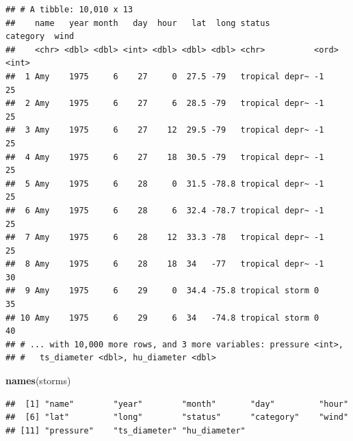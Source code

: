 \documentclass[]{article}
\newenvironment{Shaded}{\begin{snugshade}}{\end{snugshade}}
\newcommand{\CommentTok}[1]{\textcolor[rgb]{0.56,0.35,0.01}{\textit{#1}}}
\newcommand{\DataTypeTok}[1]{\textcolor[rgb]{0.13,0.29,0.53}{#1}}
\newcommand{\DecValTok}[1]{\textcolor[rgb]{0.00,0.00,0.81}{#1}}
\newcommand{\KeywordTok}[1]{\textcolor[rgb]{0.13,0.29,0.53}{\textbf{#1}}}
\newcommand{\NormalTok}[1]{#1}
\newcommand{\OperatorTok}[1]{\textcolor[rgb]{0.81,0.36,0.00}{\textbf{#1}}}
\newcommand{\StringTok}[1]{\textcolor[rgb]{0.31,0.60,0.02}{#1}}
\begin{document}
\begin{verbatim}
## # A tibble: 10,010 x 13
##    name   year month   day  hour   lat  long status         category  wind
##    <chr> <dbl> <dbl> <int> <dbl> <dbl> <dbl> <chr>          <ord>    <int>
##  1 Amy    1975     6    27     0  27.5 -79   tropical depr~ -1          25
##  2 Amy    1975     6    27     6  28.5 -79   tropical depr~ -1          25
##  3 Amy    1975     6    27    12  29.5 -79   tropical depr~ -1          25
##  4 Amy    1975     6    27    18  30.5 -79   tropical depr~ -1          25
##  5 Amy    1975     6    28     0  31.5 -78.8 tropical depr~ -1          25
##  6 Amy    1975     6    28     6  32.4 -78.7 tropical depr~ -1          25
##  7 Amy    1975     6    28    12  33.3 -78   tropical depr~ -1          25
##  8 Amy    1975     6    28    18  34   -77   tropical depr~ -1          30
##  9 Amy    1975     6    29     0  34.4 -75.8 tropical storm 0           35
## 10 Amy    1975     6    29     6  34   -74.8 tropical storm 0           40
## # ... with 10,000 more rows, and 3 more variables: pressure <int>,
## #   ts_diameter <dbl>, hu_diameter <dbl>
\end{verbatim}

\begin{Shaded}
\begin{Highlighting}[]
\KeywordTok{names}\NormalTok{(storms)}
\end{Highlighting}
\end{Shaded}

\begin{verbatim}
##  [1] "name"        "year"        "month"       "day"         "hour"       
##  [6] "lat"         "long"        "status"      "category"    "wind"       
## [11] "pressure"    "ts_diameter" "hu_diameter"
\end{verbatim}

\begin{Shaded}
\end{Shaded}
\end{document}
